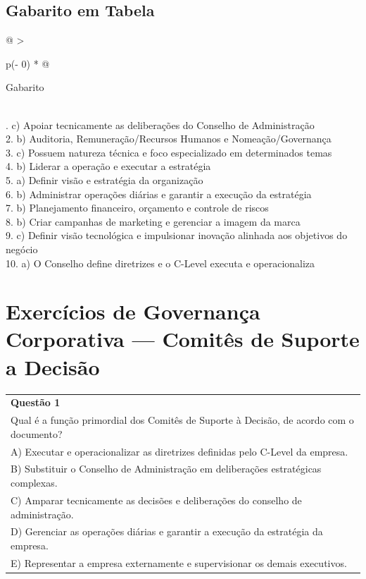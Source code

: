 \documentclass[
]{book}
\begin{document}
\subsection{Gabarito em Tabela}\label{gabarito-em-tabela}

\begin{longtable}[]{@{}
  >{\raggedright\arraybackslash}p{(\columnwidth - 0\tabcolsep) * }@{}}
\toprule\noalign{}
\begin{minipage}[b]{\linewidth}\raggedright
Gabarito
\end{minipage} \\
\midrule\noalign{}
\endhead
\bottomrule\noalign{}
. c) Apoiar tecnicamente as deliberações do Conselho de Administração \\
2. b) Auditoria, Remuneração/Recursos Humanos e Nomeação/Governança \\
3. c) Possuem natureza técnica e foco especializado em determinados temas \\
4. b) Liderar a operação e executar a estratégia \\
5. a) Definir visão e estratégia da organização \\
6. b) Administrar operações diárias e garantir a execução da estratégia \\
7. b) Planejamento financeiro, orçamento e controle de riscos \\
8. b) Criar campanhas de marketing e gerenciar a imagem da marca \\
9. c) Definir visão tecnológica e impulsionar inovação alinhada aos objetivos do negócio \\
10. a) O Conselho define diretrizes e o C-Level executa e operacionaliza \\
\end{longtable}

\section{Exercícios de Governança Corporativa --- Comitês de Suporte a Decisão}\label{exercuxedcios-de-governanuxe7a-corporativa-comituxeas-de-suporte-a-decisuxe3o}

\begin{longtable}[]{@{}
  >{\raggedright\arraybackslash}p{}@{}}
\toprule\noalign{}
\endhead
\bottomrule\noalign{}
\endlastfoot
\textbf{Questão 1} \\
Qual é a função primordial dos Comitês de Suporte à Decisão, de acordo com o documento? \\
A) Executar e operacionalizar as diretrizes definidas pelo C-Level da empresa. \\
B) Substituir o Conselho de Administração em deliberações estratégicas complexas. \\
C) Amparar tecnicamente as decisões e deliberações do conselho de administração. \\
D) Gerenciar as operações diárias e garantir a execução da estratégia da empresa. \\
E) Representar a empresa externamente e supervisionar os demais executivos. \\
\end{longtable}
\end{document}
